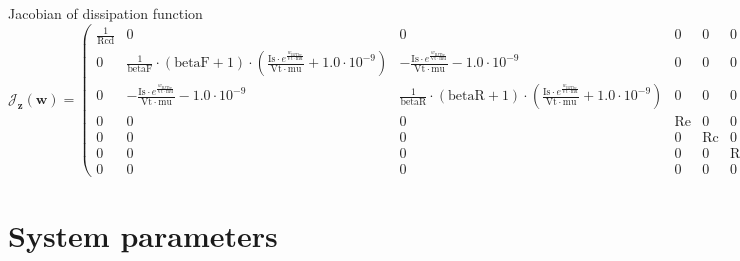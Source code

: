 \documentclass[11pt, oneside]{article}      %
\begin{document}
Jacobian of dissipation function $ \mathcal{J}_{\mathbf{z}}(\mathbf{w}) = \left(\begin{array}{ccccccc}\frac{1}{\mathrm{Rcd}} & 0 & 0 & 0 & 0 & 0 & 0\\0 & \frac{1}{\mathrm{betaF}} \cdot \left(\mathrm{betaF} + 1\right) \cdot \left(\frac{\mathrm{Is} \cdot e^{\frac{w_{\mathrm{BJTbe}}}{\mathrm{Vt} \cdot \mathrm{mu}}}}{\mathrm{Vt} \cdot \mathrm{mu}} + 1.0 \cdot 10^{-9}\right) & - \frac{\mathrm{Is} \cdot e^{\frac{w_{\mathrm{BJTbc}}}{\mathrm{Vt} \cdot \mathrm{mu}}}}{\mathrm{Vt} \cdot \mathrm{mu}} - 1.0 \cdot 10^{-9} & 0 & 0 & 0 & 0\\0 & - \frac{\mathrm{Is} \cdot e^{\frac{w_{\mathrm{BJTbe}}}{\mathrm{Vt} \cdot \mathrm{mu}}}}{\mathrm{Vt} \cdot \mathrm{mu}} - 1.0 \cdot 10^{-9} & \frac{1}{\mathrm{betaR}} \cdot \left(\mathrm{betaR} + 1\right) \cdot \left(\frac{\mathrm{Is} \cdot e^{\frac{w_{\mathrm{BJTbc}}}{\mathrm{Vt} \cdot \mathrm{mu}}}}{\mathrm{Vt} \cdot \mathrm{mu}} + 1.0 \cdot 10^{-9}\right) & 0 & 0 & 0 & 0\\0 & 0 & 0 & \mathrm{Re} & 0 & 0 & 0\\0 & 0 & 0 & 0 & \mathrm{Rc} & 0 & 0\\0 & 0 & 0 & 0 & 0 & \mathrm{Rb} & 0\\0 & 0 & 0 & 0 & 0 & 0 & \mathrm{Rbc}\end{array}\right) ; $ 
%
\\
%
%
\section{System parameters}
%
%
\end{document}
